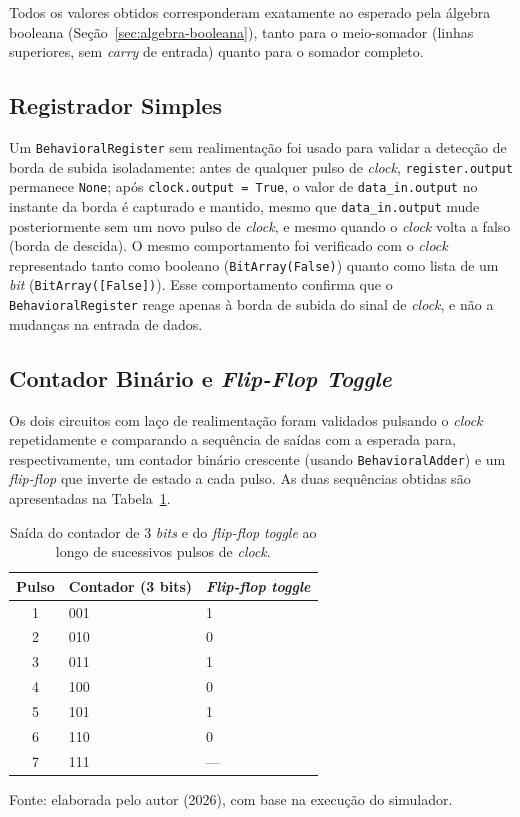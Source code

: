 Todos os valores obtidos corresponderam exatamente ao esperado pela álgebra booleana (Seção~\ref{sec:algebra-booleana}), tanto para o meio-somador (linhas superiores, sem \textit{carry} de entrada) quanto para o somador completo.


\subsection{Registrador Simples}

Um \texttt{BehavioralRegister} sem realimentação foi usado para validar a detecção de borda de subida isoladamente: antes de qualquer pulso de \textit{clock}, \texttt{register.output} permanece \texttt{None}; após \texttt{clock.output = True}, o valor de \texttt{data\_in.output} no instante da borda é capturado e mantido, mesmo que \texttt{data\_in.output} mude posteriormente sem um novo pulso de \textit{clock}, e mesmo quando o \textit{clock} volta a falso (borda de descida). O mesmo comportamento foi verificado com o \textit{clock} representado tanto como booleano (\texttt{BitArray(False)}) quanto como lista de um \textit{bit} (\texttt{BitArray([False])}). Esse comportamento confirma que o \texttt{BehavioralRegister} reage apenas à borda de subida do sinal de \textit{clock}, e não a mudanças na entrada de dados.

\subsection{Contador Binário e \textit{Flip-Flop Toggle}}
\label{sec:log-propagacao}

Os dois circuitos com laço de realimentação foram validados pulsando o \textit{clock} repetidamente e comparando a sequência de saídas com a esperada para, respectivamente, um contador binário crescente (usando \texttt{BehavioralAdder}) e um \textit{flip-flop} que inverte de estado a cada pulso. As duas sequências obtidas são apresentadas na Tabela~\ref{tab:contador-toggle}.

\begin{table}[H]
\centering
\caption{Saída do contador de 3 \textit{bits} e do \textit{flip-flop} \textit{toggle} ao longo de sucessivos pulsos de \textit{clock}.}
\label{tab:contador-toggle}
\begin{tabular}{c|l|l}
\hline
\textbf{Pulso} & \textbf{Contador (3 bits)} & \textbf{\textit{Flip-flop} \textit{toggle}} \\
\hline
1 & 001 & 1 \\
2 & 010 & 0 \\
3 & 011 & 1 \\
4 & 100 & 0 \\
5 & 101 & 1 \\
6 & 110 & 0 \\
7 & 111 & --- \\
\hline
\end{tabular}
\begin{center}
\footnotesize Fonte: elaborada pelo autor (2026), com base na execução do simulador.
\end{center}
\end{table}


